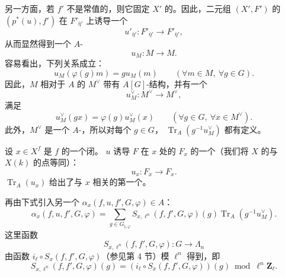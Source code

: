 另一方面，若 $f'$ 不是常值的，则它固定 $X'$ 的。因此，二元组 $(X',F')$ 的 $(p^*(u),f')$ 在 $F'_{\bar\eta'}$ 上诱导一个
\[
u'_{\bar\eta'}:F'_{\bar\eta'}\longrightarrow F'_{\bar\eta'},
\]
从而显然得到一个 $A$-
\[
u_M:M\longrightarrow M.
\]
容易看出，下列关系成立：
\[
u_M(\varphi(g)m)=gu_M(m)\qquad(\forall m\in M,\ \forall g\in G).
\tag{6.2.1}
\]
因此，$M$ 相对于 $A$ 的 $M^\vee$ 带有 $A[G]$-结构，并有一个
\[
u_M^\vee:M^\vee\longrightarrow M^\vee,
\]
满足
\[
u_M^\vee(gx)=\varphi(g)u_M^\vee(x)
\qquad(\forall g\in G,\ \forall x\in M^\vee).
\]
此外，$M^\vee$ 是一个 $A$-，所以对每个 $g\in G$， $\operatorname{Tr}_A(g^{-1}u_M^\vee)$ 都有定义。

设 $x\in X^f$ 是 $f$ 的一个闭。 $u$ 诱导 $F$ 在 $x$ 处的 $F_x$ 的一个（我们将 $X$ 的与 $X(k)$ 的点等同）：
\[
u_x:F_x\longrightarrow F_x.
\]
 $\operatorname{Tr}_A(u_x)$ 给出了与 $x$ 相关的第一个。

再由下式引入另一个 $\alpha_x(f,u,f',G,\varphi)\in A$：
\[
\alpha_x(f,u,f',G,\varphi)
=\sum_{g\in G_{\natural,\varphi}}
 S_{x,\ell^n}(f,f',G,\varphi)(g)\operatorname{Tr}_A(g^{-1}u_M^\vee).
\tag{6.2.2}
\]
这里函数
\[
S_{x,\ell^n}(f,f',G,\varphi):G\longrightarrow\Lambda_n
\]
由函数 $i_\ell\circ S_x(f,f',G,\varphi)$（参见第 4 节）模 $\ell^n$ 得到，即
\[
S_{x,\ell^n}(f,f',G,\varphi)(g)
=(i_\ell\circ S_x(f,f',G,\varphi))(g)\bmod\ell^n\mathbf Z_\ell.
\]

